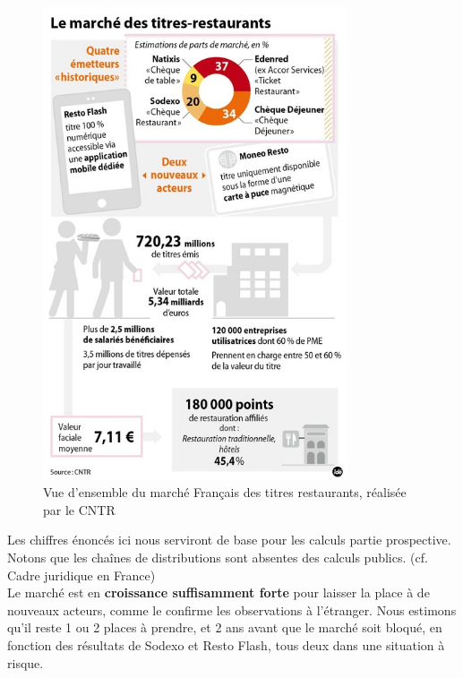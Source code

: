   \begin{figure}[htpb]
      \centering
      \includegraphics[width=0.8\textwidth]{image06}
      \caption{Vue d’ensemble du marché Français des titres restaurants, réalisée par le CNTR}
      \label{fig:image06}
  \end{figure}

Les chiffres énoncés ici nous serviront de base pour les calculs partie
prospective. Notons que les chaînes de distributions sont absentes des calculs
publics. (cf. Cadre juridique en France) \\

Le marché est en \textbf{croissance suffisamment forte} pour laisser la place à
de nouveaux acteurs, comme le confirme les observations à l’étranger. Nous
estimons qu’il reste 1 ou 2 places à prendre, et 2 ans avant que le marché soit
bloqué, en fonction des résultats de Sodexo et Resto Flash, tous deux dans une
situation à risque. \\

